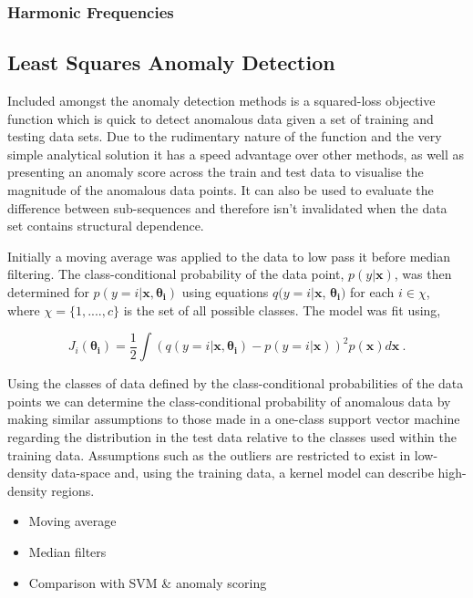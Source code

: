 \subsubsection{Harmonic Frequencies}

\subsection{Least Squares Anomaly Detection}
Included amongst the anomaly detection methods is a squared-loss objective function which is quick to detect anomalous data given a set of training and testing data sets. Due to the rudimentary nature of the function and the very simple analytical solution it has a speed advantage over other methods, as well as presenting an anomaly score across the train and test data to visualise the magnitude of the anomalous data points. It can also be used to evaluate the difference between sub-sequences and therefore isn't invalidated when the data set contains structural dependence.

Initially a moving average was applied to the data to low pass it before median filtering. The class-conditional probability of the data point,  $p(y|\mathbf{x})$, was then determined for $p(y=i|\mathbf{x}, \mathbf{\theta_i})$ using equations $q(y=i|\mathbf{x}$, $\mathbf{\theta_i})$ for each $i \in \chi$, where $\chi = \{1, ...., c\}$ is the set of all possible classes. The model was fit using,

\begin{equation}
    J_i(\mathbf{\theta_i})=\dfrac{1}{2}\int(q(y=i|\mathbf{x},\mathbf{\theta_i}) - p(y=i|\mathbf{x}))^2p(\mathbf{x})d\mathbf{x}~.
\end{equation}

Using the classes of data defined by the class-conditional probabilities of the data points we can determine the class-conditional probability of anomalous data by making similar assumptions to those made in a one-class support vector machine regarding the distribution in the test data relative to the classes used within the training data. Assumptions such as the outliers are restricted to exist in low-density data-space and, using the training data, a kernel model can describe high-density regions.

\begin{itemize}
\item Moving average
\item Median filters
\item Comparison with SVM \& anomaly scoring
\end{itemize}

